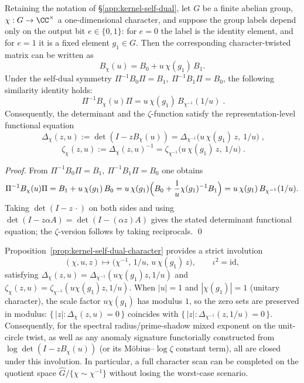 \begin{proposition}\label{prop:kernel-self-dual-character}
Retaining the notation of \S\ref{app:kernel-self-dual}, let \(G\) be a finite abelian group, \(\chi:G\to\CC^\times\) a one-dimensional character, and suppose the group labels depend only on the output bit \(e\in\{0,1\}\): for \(e=0\) the label is the identity element, and for \(e=1\) it is a fixed element \(g_1\in G\).
Then the corresponding character-twisted matrix can be written as
\[
B_\chi(u)=B_0+u\,\chi(g_1)\,B_1.
\]
Under the self-dual symmetry \(\Pi^{-1}B_0\Pi=B_1,\ \Pi^{-1}B_1\Pi=B_0\), the following similarity identity holds:
\[
\boxed{\;
\Pi^{-1}B_\chi(u)\Pi
=u\,\chi(g_1)\,B_{\chi^{-1}}(1/u)\; }.
\]
Consequently, the determinant and the \(\zeta\)-function satisfy the representation-level functional equation
\[
\boxed{\;
\Delta_\chi(z,u):=\det(I-zB_\chi(u))
=\Delta_{\chi^{-1}}\!\bigl(u\,\chi(g_1)\,z,\ 1/u\bigr)\; },
\]
\[
\boxed{\;
\zeta_\chi(z,u):=\Delta_\chi(z,u)^{-1}
=\zeta_{\chi^{-1}}\!\bigl(u\,\chi(g_1)\,z,\ 1/u\bigr)\; }.
\]
\end{proposition}
\begin{proof}
From \(\Pi^{-1}B_0\Pi=B_1,\ \Pi^{-1}B_1\Pi=B_0\) one obtains
\[
\Pi^{-1}B_\chi(u)\Pi
=B_1+u\,\chi(g_1)\,B_0
=u\,\chi(g_1)\Bigl(B_0+\frac{1}{u}\chi(g_1)^{-1}B_1\Bigr)
=u\,\chi(g_1)\,B_{\chi^{-1}}(1/u).
\]
Taking \(\det(I-z\,\cdot)\) on both sides and using \(\det(I-z\alpha A)=\det(I-(\alpha z)A)\) gives the stated determinant functional equation; the \(\zeta\)-version follows by taking reciprocals. \qed
\end{proof}

\begin{remark}\label{rem:kernel-self-dual-character-dihedral}
Proposition~\ref{prop:kernel-self-dual-character} provides a strict involution
\[
(\chi,u,z)\longmapsto\bigl(\chi^{-1},\,1/u,\,u\,\chi(g_1)\,z\bigr),
\qquad \iota^2=\mathrm{id},
\]
satisfying \(\Delta_\chi(z,u)=\Delta_{\chi^{-1}}(u\chi(g_1)z,1/u)\) and \(\zeta_\chi(z,u)=\zeta_{\chi^{-1}}(u\chi(g_1)z,1/u)\).
When \(|u|=1\) and \(|\chi(g_1)|=1\) (unitary character), the scale factor \(u\chi(g_1)\) has modulus \(1\), so the zero sets are preserved in modulus: \(\{\,|z|:\Delta_\chi(z,u)=0\,\}\) coincides with \(\{\,|z|:\Delta_{\chi^{-1}}(z,1/u)=0\,\}\).
Consequently, for the spectral radius/prime-shadow mixed exponent on the unit-circle twist, as well as any anomaly signature functorially constructed from \(\log\det(I-zB_\chi(u))\) (or its Möbius--\(\log\zeta\) constant term), all are closed under this involution.
In particular, a full character scan can be completed on the quotient space \(\widehat G/\{\chi\sim\chi^{-1}\}\) without losing the worst-case scenario.
\end{remark}

